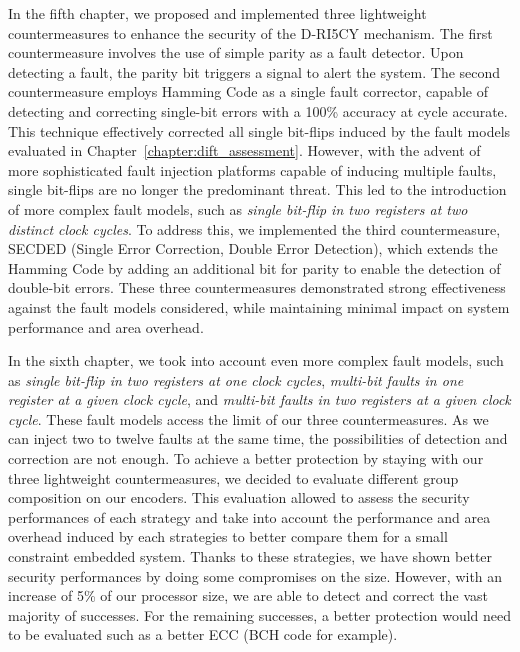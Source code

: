 In the fifth chapter, we proposed and implemented three lightweight countermeasures to enhance the security of the D-RI5CY mechanism. The first countermeasure involves the use of simple parity as a fault detector. Upon detecting a fault, the parity bit triggers a signal to alert the system. The second countermeasure employs Hamming Code as a single fault corrector, capable of detecting and correcting single-bit errors with a 100\% accuracy at cycle accurate. This technique effectively corrected all single bit-flips induced by the fault models evaluated in Chapter~\ref{chapter:dift_assessment}. However, with the advent of more sophisticated fault injection platforms capable of inducing multiple faults, single bit-flips are no longer the predominant threat. This led to the introduction of more complex fault models, such as \textit{single bit-flip in two registers at two distinct clock cycles}. To address this, we implemented the third countermeasure, SECDED (Single Error Correction, Double Error Detection), which extends the Hamming Code by adding an additional bit for parity to enable the detection of double-bit errors. These three countermeasures demonstrated strong effectiveness against the fault models considered, while maintaining minimal impact on system performance and area overhead.

In the sixth chapter, we took into account even more complex fault models, such as \textit{single bit-flip in two registers at one clock cycles}, \textit{multi-bit faults in one register at a given clock cycle}, and \textit{multi-bit faults in two registers at a given clock cycle}. These fault models access the limit of our three countermeasures. As we can inject two to twelve faults at the same time, the possibilities of detection and correction are not enough. To achieve a better protection by staying with our three lightweight countermeasures, we decided to evaluate different group composition on our encoders. This evaluation allowed to assess the security performances of each strategy and take into account the performance and area overhead induced by each strategies to better compare them for a small constraint embedded system. Thanks to these strategies, we have shown better security performances by doing some compromises on the size. However, with an increase of 5\% of our processor size, we are able to detect and correct the vast majority of successes. For the remaining successes, a better protection would need to be evaluated such as a better ECC (BCH code for example).

